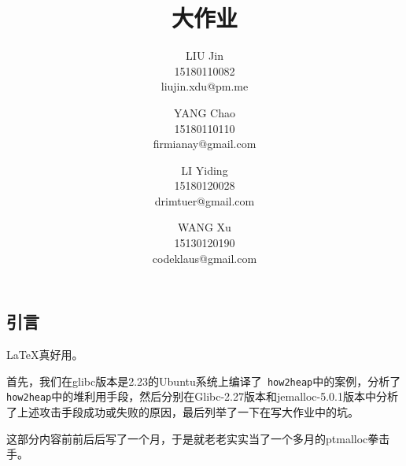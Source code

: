 \documentclass{article}
\title{\classname{} 大作业}
\author{LIU Jin\\
15180110082 \\
liujin.xdu@pm.me \and
YANG Chao\\
15180110110 \\
firmianay@gmail.com \and
LI Yiding\\
15180120028 \\
drimtuer@gmail.com \and
WANG Xu\\
15130120190 \\
codeklaus@gmail.com
}
\begin{document}
\maketitle

\renewcommand{\contentsname}{目录}

\newpage
\tableofcontents
\newpage

\begin{center}
    \section{引言}
\end{center}

\setlength{\parindent}{2em}

 \LaTeX 真好用。
 
 首先，我们在glibc版本是2.23的Ubuntu系统上编译了\verb+ how2heap+中的案例，分析了\verb+ how2heap+中的堆利用手段，然后分别在Glibc-2.27版本和jemalloc-5.0.1版本中分析了上述攻击手段成功或失败的原因，最后列举了一下在写大作业中的坑。
 
 这部分内容前前后后写了一个月，于是就老老实实当了一个多月的ptmalloc拳击手。

\newpage
% 



% 

% 

% 
\end{document}
